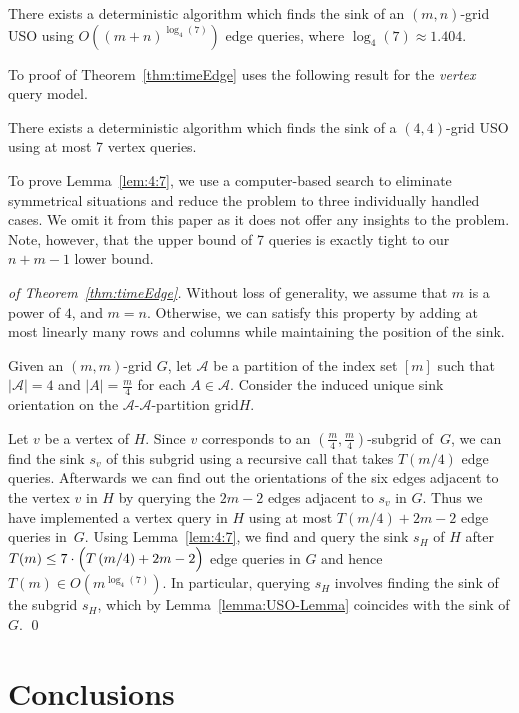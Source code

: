 \documentclass[runningheads,a4paper]{llncs}
\newcommand{\A}{\ensuremath{\mathcal A}}
\newcommand{\aapart}{$\A$-$\A$-partition grid\xspace}
\begin{document}
\begin{theorem}
    \label{thm:timeEdge}
    There exists a deterministic algorithm which finds the sink of an $(m,n)$-grid USO using $O((m+n) ^ {\log_4(7)})$ edge queries, where $\log_4(7) \approx 
    1.404$.
\end{theorem}

To proof of Theorem~\ref{thm:timeEdge} uses the following result for the \emph{vertex} query model.

\begin{lemma}
    \label{lem:4:7}
    There exists a deterministic algorithm which finds the sink of a\linebreak
    $(4,4)$-grid USO using at most 7 vertex queries.
\end{lemma}
To prove Lemma~\ref{lem:4:7}, we use a computer-based search to eliminate symmetrical situations and reduce the problem to three individually handled cases.
We omit it from this paper as it does not offer any insights to the problem. Note, however, that the upper bound of 7 queries is exactly tight 
to our $n + m -1$ lower bound.

\begin{proof}[of Theorem~\ref{thm:timeEdge}]
    Without loss of generality, we assume that $m$ is a power of $4$, and
    $m=n$. Otherwise, we can satisfy this property by adding at most linearly many rows and columns while maintaining the position of the sink.

    Given an $(m,m)$-grid $G$, let $\A$
    be a partition of the index set $[m]$ such that
    $|\A| = 4$ and $|A| = \frac{m}{4}$ for each $A \in \A$.
    Consider the induced unique sink orientation on the \aapart $H$.
    
    
    Let $v$ be a vertex of $H$. Since $v$ corresponds to an $(\frac{m}{4},\frac{m}{4})$-subgrid of~$G$, we can find the sink $s_v$ of this subgrid using a recursive call that takes $T(m/4)$ edge queries.
    Afterwards we can find out the orientations of the six edges
    adjacent to the vertex $v$ in $H$ by querying the $2m-2$ edges adjacent to $s_v$ in $G$.
    Thus we have implemented a vertex query in $H$ using at most $T(m/4) + 2m - 2$ edge queries in~$G$.
Using Lemma~\ref{lem:4:7}, we find and query
the sink $s_H$ of $H$ after
$T(m) \le 7 \cdot \Bigl( T \left( m/4 \right) + 2m-2 \Bigr)$
    edge queries in $G$ and hence $T(m) \in O(m ^ {\log_4(7)})$. 
    In particular, querying $s_H$ involves finding the sink of the subgrid
    $s_H$, which by Lemma~\ref{lemma:USO-Lemma} coincides with the sink of
    $G$.
    \qed
\end{proof}
\vspace{-.1in}\section{Conclusions}
\end{document}
